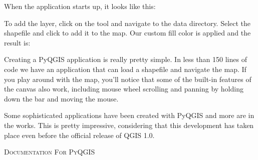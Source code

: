 When the application starts up, it looks like this:


To add the  layer, click on the 
 tool and navigate to the data directory.
Select the shapefile and click  to add it to the map. 
Our custom fill color is applied and the result is:


Creating a PyQGIS application is really pretty simple.  In less than 150 lines
of code we have an application that can load a shapefile and navigate the map.
If you play around with the map, you'll notice that some of the built-in
features of the canvas also work, including mouse wheel scrolling and panning
by holding down the  bar and moving the mouse.

Some sophisticated applications have been created with PyQGIS and more are in 
the works. This is pretty impressive, considering that this development has 
taken place even before the official release of QGIS 1.0.

\begin{Tip}\caption{\textsc{Documentation For PyQGIS}}
\end{Tip} 

